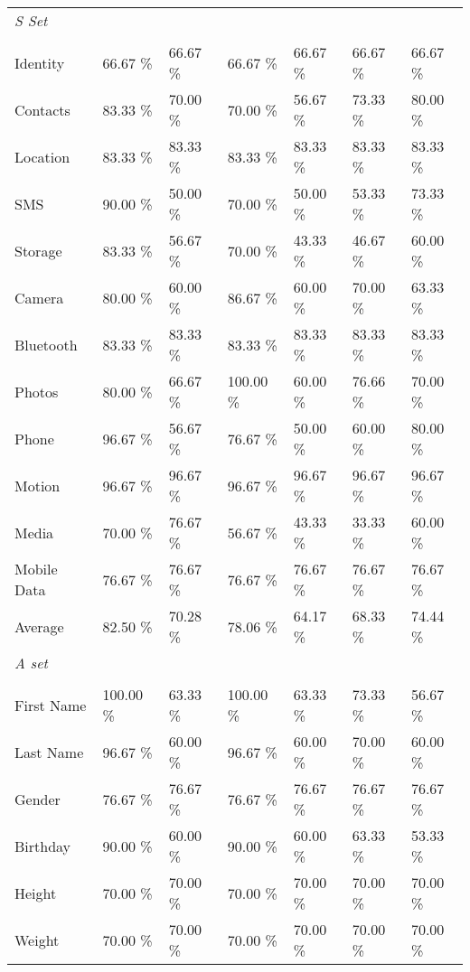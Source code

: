 \begin{appendices}
\begin{table*}
\begin{tabular}{P{2.5cm}P{1.7cm}P{1.6cm}P{1.5cm}P{1.5cm}P{1.5cm}P{1.9cm}}
\textit{S Set}\\
\\
Identity & 66.67 \% & 66.67 \% &66.67 \%  & 66.67 \% &  66.67 \% & 66.67 \%\\
Contacts & 83.33 \% & 70.00 \% &70.00 \% & 56.67 \% & 73.33 \% & 80.00 \%\\
Location & 83.33 \% & 83.33 \% &83.33 \% &  83.33 \% & 83.33 \% & 83.33 \%\\
SMS  & 90.00 \% & 50.00 \% & 70.00 \% & 50.00 \% & 53.33 \% & 73.33 \%\\
Storage & 83.33 \% & 56.67 \% &70.00 \%  & 43.33 \% & 46.67 \%& 60.00 \%\\
Camera  & 80.00 \% & 60.00 \% &86.67 \%  & 60.00 \% & 70.00 \% & 63.33 \%\\
Bluetooth & 83.33 \% & 83.33 \% & 83.33 \%  & 83.33 \% & 83.33 \% & 83.33 \%\\
Photos & 80.00 \% & 66.67 \%  & 100.00 \%  & 60.00 \%  & 76.66 \% & 70.00 \%\\
Phone & 96.67 \% & 56.67 \% & 76.67 \% & 50.00 \% & 60.00 \% & 80.00 \%\\
Motion & 96.67 \% & 96.67 \% & 96.67 \% & 96.67 \% & 96.67 \% & 96.67 \%\\
Media & 70.00 \% & 76.67 \% & 56.67 \% & 43.33 \% & 33.33 \% & 60.00 \%\\
Mobile Data & 76.67 \% & 76.67 \% &76.67 \% & 76.67 \% & 76.67 \% & 76.67 \%\\

\cmidrule(r){2-7}
Average & 82.50 \%& 70.28 \% & 78.06 \% & 64.17 \% & 68.33 \% & 74.44 \%\\
\cmidrule(r){1-7}
\textit{A set}\\
\\

First Name &100.00 \% & 63.33 \% &100.00 \%& 63.33 \%& 73.33 \% & 56.67 \%\\
Last Name &96.67 \% &60.00 \% &96.67 \%& 60.00 \%& 70.00 \% & 60.00 \%\\
Gender &76.67 \% &76.67 \% & 76.67 \% & 76.67 \%& 76.67 \% & 76.67 \%\\
Birthday &90.00 \%&60.00 \% &90.00 \%  & 60.00 \% & 63.33 \%& 53.33 \%\\
Height &70.00 \% &70.00 \% & 70.00 \% & 70.00 \% & 70.00 \%& 70.00 \%\\
Weight &70.00 \% &70.00 \% & 70.00 \% & 70.00 \%& 70.00 \%& 70.00 \%\\


\end{tabular}
\end{table*}
\end{appendices}
